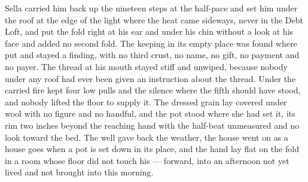 Sella carried him back up the nineteen steps at the half-pace and set him under the roof at the edge of the light where the heat came sideways, never in the Debt Loft, and put the fold right at his ear and under his chin without a look at his face and added no second fold. The keeping in its empty place was found where put and stayed a finding, with no third crust, no name, no gift, no payment and no payer. The thread at his mouth stayed stiff and unwiped, because nobody under any roof had ever been given an instruction about the thread. Under  the carried fire kept four low pulls and the silence where the fifth should have stood, and nobody lifted the floor to supply it. The dressed grain lay covered under wool with no figure and no handful, and the pot stood where she had set it, its rim two inches beyond the reaching hand with the half-beat unmeasured and no look toward the bed. The well gave back the weather, the house went on as a house goes when a pot is set down in its place, and the hand lay flat on the fold in a room whose floor did not touch his --- forward, into an afternoon not yet lived and not brought into this morning.
